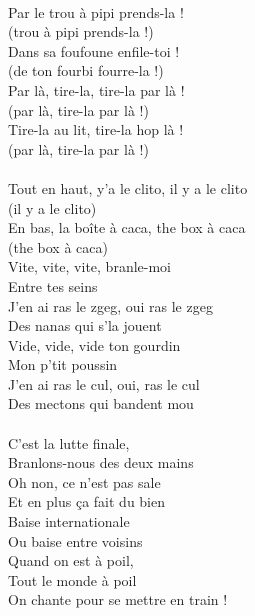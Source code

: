 \\Par le trou à pipi prends-la !
\\(trou à pipi prends-la !)
\\Dans sa foufoune enfile-toi !
\\(de ton fourbi fourre-la !)
\\Par là, tire-la, tire-la par là !
\\(par là, tire-la par là !)
\\Tire-la au lit, tire-la hop là !
\\(par là, tire-la par là !)
\\\\Tout en haut, y'a le clito, il y a le clito
\\(il y a le clito)
\\En bas, la boîte à caca, the box à caca
\\(the box à caca)
\\Vite, vite, vite, branle-moi
\\Entre tes seins
\\J'en ai ras le zgeg, oui ras le zgeg
\\Des nanas qui s'la jouent
\\Vide, vide, vide ton gourdin
\\Mon p'tit poussin
\\J'en ai ras le cul, oui, ras le cul
\\Des mectons qui bandent mou
\\\\C'est la lutte finale,
\\Branlons-nous des deux mains
\\Oh non, ce n'est pas sale
\\Et en plus ça fait du bien
\\Baise internationale
\\Ou baise entre voisins
\\Quand on est à poil,
\\Tout le monde à poil
\\On chante pour se mettre en train !

\breakpage